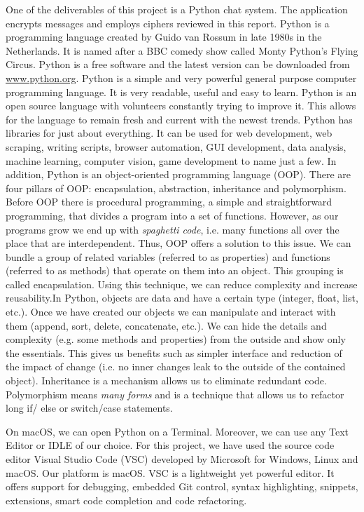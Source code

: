 One of the deliverables of this project is a Python chat system. The application encrypts messages and employs ciphers reviewed in this report. Python is a programming language created by Guido van Rossum in late 1980s in the Netherlands. It is named after a BBC comedy show called Monty Python's Flying Circus. Python is a free software and the latest version can be downloaded from \url{www.python.org}. Python is a simple and very powerful general purpose computer programming language. It is very readable, useful and easy to learn. Python is an open source language with volunteers constantly trying to improve it. This allows for the language to remain fresh and current with the newest trends. Python has libraries for just about everything. It can be used for web development, web scraping, writing scripts, browser automation, GUI development, data analysis, machine learning, computer vision, game development to name just a few. In addition, Python is an object-oriented programming language (OOP). There are four pillars of OOP: encapsulation, abstraction, inheritance and polymorphism. Before OOP there is procedural programming, a simple and straightforward programming, that divides a program into a set of functions. However, as our programs grow we end up with \emph{spaghetti code}, i.e. many functions all over the place that are interdependent. Thus, OOP offers a solution to this issue. We can bundle a group of related variables (referred to as properties) and functions (referred to as methods) that operate on them into an object. This grouping is called encapsulation. Using this technique, we can reduce complexity and increase reusability.In Python, objects are data and have a certain type (integer, float, list, etc.). Once we have created our objects we can manipulate and interact with them (append, sort, delete, concatenate, etc.). We can hide the details and complexity (e.g. some methods and properties) from the outside and show only the essentials. This gives us benefits such as simpler interface and reduction of the impact of change (i.e. no inner changes leak to the outside of the contained object). Inheritance is a mechanism allows us to eliminate redundant code. Polymorphism means \emph{many forms} and is a technique that allows us to refactor long if/ else or switch/case statements. 

On macOS, we can open Python on a Terminal. Moreover, we can use any Text Editor or IDLE of our choice. For this project, we have used the source code editor Visual Studio Code (VSC) developed by Microsoft for Windows, Linux and macOS. Our platform is macOS. VSC is a lightweight yet powerful editor. It offers support for debugging, embedded Git control, syntax highlighting, snippets, extensions, smart code completion and code refactoring. 

